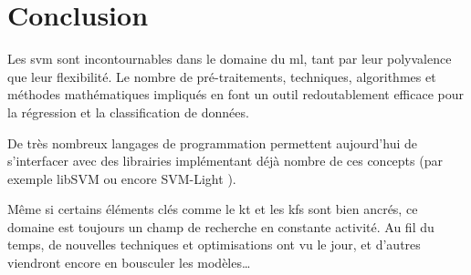 \section{Conclusion}

Les \gls{svm} sont incontournables dans le domaine du \gls{ml},
tant par leur polyvalence que leur flexibilité.
Le nombre de pré-traitements, techniques, algorithmes et méthodes
mathématiques impliqués en font un outil redoutablement efficace
pour la régression et la classification de données.

De très nombreux langages de programmation permettent aujourd’hui de
s’interfacer avec des librairies implémentant déjà nombre de ces concepts
(par exemple libSVM \cite{lib-svm} ou encore SVM-Light \cite{lib-svm-light}).

Même si certains éléments clés comme le \gls{kt} et les \glspl{kf}
sont bien ancrés, ce domaine est toujours un champ de recherche en
constante activité. Au fil du temps, de nouvelles techniques et optimisations
ont vu le jour, et d’autres viendront encore en bousculer les modèles…

\pagebreak
